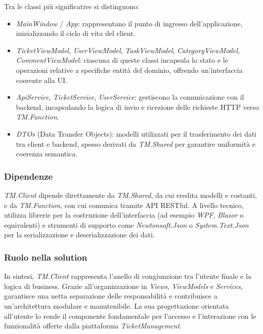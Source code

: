 Tra le classi più significative si distinguono:
\begin{itemize}
\item \textit{MainWindow} / \textit{App}: rappresentano il punto di ingresso dell'applicazione, inizializzando il ciclo di vita del client.

\item \textit{TicketViewModel}, \textit{UserViewModel}, \textit{TaskViewModel}, \textit{CategoryViewModel}, \textit{CommentViewModel}: ciascuna di queste classi incapsula lo stato e le operazioni relative a specifiche entità del dominio, offrendo un'interfaccia coerente alla UI.

\item \textit{ApiService}, \textit{TicketService}, \textit{UserService}: gestiscono la comunicazione con il backend, incapsulando la logica di invio e ricezione delle richieste HTTP verso \textit{TM.Function}.

\item \textit{DTOs} (Data Transfer Objects): modelli utilizzati per il trasferimento dei dati tra client e backend, spesso derivati da \textit{TM.Shared} per garantire uniformità e coerenza semantica.
\end{itemize}

\subsubsection{Dipendenze}

\textit{TM.Client} dipende direttamente da \textit{TM.Shared}, da cui eredita modelli e costanti, e da \textit{TM.Function}, con cui comunica tramite API RESTful. A livello tecnico, utilizza librerie per la costruzione dell'interfaccia (ad esempio \textit{WPF}, \textit{Blazor} o equivalenti) e strumenti di supporto come \textit{Newtonsoft.Json} o \textit{System.Text.Json} per la serializzazione e deserializzazione dei dati.

\subsubsection{Ruolo nella solution}

In sintesi, \textit{TM.Client} rappresenta l'anello di congiunzione tra l'utente finale e la logica di business. Grazie all'organizzazione in \textit{Views}, \textit{ViewModels} e \textit{Services}, garantisce una netta separazione delle responsabilità e contribuisce a un'architettura modulare e manutenibile. La sua progettazione orientata all'utente lo rende il componente fondamentale per l'accesso e l'interazione con le funzionalità offerte dalla piattaforma \textit{TicketManagement}.

